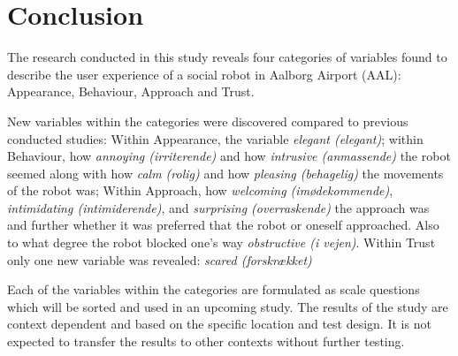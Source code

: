\section{Conclusion}
\label{Conclusion}


The research conducted in this study reveals four categories of variables found to describe the user experience of a social robot in Aalborg Airport (AAL): Appearance, Behaviour, Approach and Trust.

New variables within the categories were discovered compared to previous conducted studies: Within Appearance, the variable \textit{elegant (elegant)}; within Behaviour, how \textit{annoying (irriterende)} and how \textit{intrusive (anmassende)} the robot seemed along with how \textit{calm (rolig)} and how \textit{pleasing (behagelig)} the movements of the robot was; Within Approach, how \textit{welcoming (imødekommende)}, \textit{intimidating (intimiderende)}, and \textit{surprising (overraskende)} the approach was and further whether it was preferred that the robot or oneself approached. Also to what degree the robot blocked one's way \textit{obstructive (i vejen)}. Within Trust only one new variable was revealed: \textit{scared (forskrækket)}

Each of the variables within the categories are formulated as scale questions which will be sorted and used in an upcoming study. The results of the study are context dependent and based on the specific location and test design. It is not expected to transfer the results to other contexts without further testing. 

